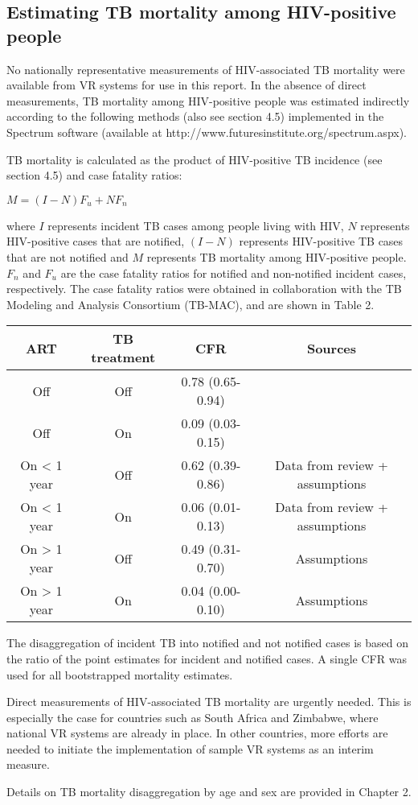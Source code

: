 \subsection{Estimating TB mortality among HIV-positive people}

No nationally representative measurements of HIV-associated TB mortality were available from VR systems for use in this report. In the absence of direct measurements, TB mortality among HIV-positive people was estimated indirectly according to the following methods (also see section 4.5) implemented in the Spectrum software (available at http://www.futuresinstitute.org/spectrum.aspx).

TB mortality is calculated as the product of HIV-positive TB incidence (see section 4.5) and case fatality ratios:

$M = (I-N)F_u + NF_n$ 									

where $I$ represents incident TB cases among people living with HIV, $N$ represents HIV-positive cases that are notified, $(I-N)$ represents HIV-positive TB cases that are not notified and $M$ represents TB mortality among HIV-positive people. $F_n$ and $F_u$ are the case fatality ratios for notified and non-notified incident cases, respectively. The case fatality ratios were obtained in collaboration with the TB Modeling and Analysis Consortium (TB-MAC), and are shown in Table 2.

\begin{table} 
    \begin{tabular}{ c c c c }
        ART & TB treatment & CFR & Sources \\ 
        \hline 
        Off & Off & 0.78 (0.65-0.94) &  \cite{12742798} \\ 
        Off & On  & 0.09 (0.03-0.15) & \cite{21738585} \cite{11216921}\\ 
        On < 1 year & Off & 0.62 (0.39-0.86) & Data from review + assumptions \\ 
        On < 1 year & On  &  0.06 (0.01-0.13) & Data from review + assumptions \\ 
        On > 1 year & Off & 0.49 (0.31-0.70) & Assumptions \\ 
        On > 1 year & On & 0.04 (0.00-0.10) & Assumptions \\ 
    \end{tabular} 
\end{table}

The disaggregation of incident TB into notified and not notified cases is based on the ratio of the point estimates for incident and notified cases. A single CFR was used for all bootstrapped mortality estimates.

Direct measurements of HIV-associated TB mortality are urgently needed. This is especially the case for countries such as South Africa and Zimbabwe, where national VR systems are already in place. In other countries, more efforts are needed to initiate the implementation of sample VR systems as an interim measure.

Details on TB mortality disaggregation by age and sex are provided in Chapter 2.


